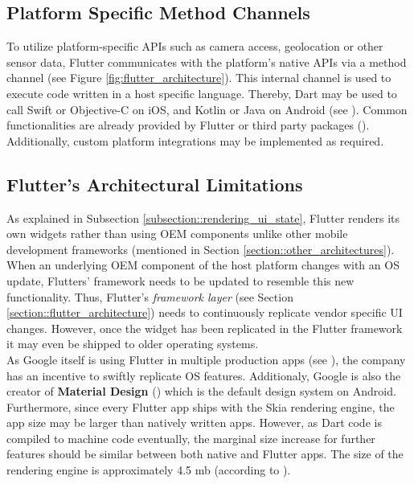 \subsection{Platform Specific Method Channels} \label{subsection::method_channels}
To utilize platform-specific APIs such as camera access, geolocation or other sensor data, Flutter communicates with the platform's native APIs via 
a method channel (see Figure \ref{fig:flutter_architecture}). 
This internal channel is used to execute code written in a host specific language. Thereby, Dart may be used to call Swift or Objective-C on iOS, and Kotlin or Java on Android (see \cite{PlatformChannel2021}).
Common functionalities are already provided by Flutter or third party packages (\cite{PubDev2021}). Additionally, custom platform integrations may be 
implemented as required.

\subsection{Flutter's Architectural Limitations}
As explained in Subsection \ref{subsection::rendering_ui_state}, Flutter renders its own widgets rather than using OEM components unlike other mobile development frameworks (mentioned in Section \ref{section::other_architectures}). 
When an underlying OEM component of the host platform changes with an OS update, Flutters' framework needs to be updated to resemble this new 
functionality. 
Thus, Flutter's \textit{framework layer} (see Section \ref{section::flutter_architecture}) needs to continuously replicate vendor specific UI changes.
However, once the widget has been replicated in the Flutter framework it may even be shipped to older operating systems.\\
As Google itself is using Flutter in multiple production apps (see \cite{FlutterShowcase2021}), the company has an incentive to swiftly replicate OS features.
Additionaly, Google is also the creator of \textbf{Material Design} (\cite{Google2021}) which is the default design system on Android.\\
Furthermore, since every Flutter app ships with the Skia rendering engine, the app size may be larger than natively written apps.
However, as Dart code is compiled to machine code eventually, the marginal size increase for further features should be similar between both native 
and Flutter apps.
The size of the rendering engine is approximately 4.5 mb (according to \cite{FlutterFAQ2021}).